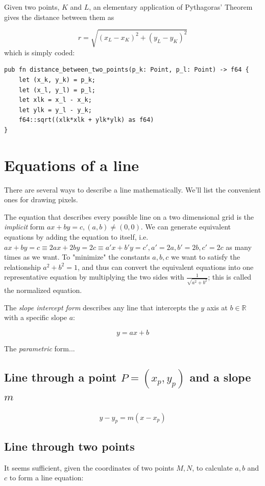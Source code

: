 \documentclass[12pt,a4,oneside,usenames,dvipsnames]{book}
\newcommand\pixels{{\pixelfont{}pixels}}
\begin{document}
Given two points, $K$ and $L$, an elementary application of Pythagoras' Theorem gives the distance between them as

\begin{equation}
  r = \sqrt{(x_{L} - x_{K})^{2} +(y_{L} - y_{K})^{2}}
\end{equation}
which is simply coded:
\begin{verbatim}
pub fn distance_between_two_points(p_k: Point, p_l: Point) -> f64 {
    let (x_k, y_k) = p_k;
    let (x_l, y_l) = p_l;
    let xlk = x_l - x_k;
    let ylk = y_l - y_k;
    f64::sqrt((xlk*xlk + ylk*ylk) as f64)
}
\end{verbatim}
\chapter{Equations of a line}\label{ch:equations-lines}
There are several ways to describe a line mathematically. We'll list the convenient ones for drawing \pixels{}.

The equation that describes every possible line on a two dimensional grid is the \emph{implicit} form $ax+by=c, (a,b) \neq{} (0,0)$. We can generate equivalent equations by adding the equation to itself, i.e. $ax+by=c \equiv 2ax+2by=2c \equiv a'x+b'y=c', a'=2a, b'=2b, c'=2c$ as many times as we want. To "minimize" the constants $a,b,c$ we want to satisfy the relationship $a^{2}+b^{2}=1$, and thus can convert the equivalent equations into one representative equation by multiplying the two sides with $\frac{1}{\sqrt{a^2+b^2}}$; this is called the normalized equation. %

The \emph{slope intercept form} describes any line that intercepts the $y$ axis at $b \in{} \mathbb{R}$ with a specific slope $a$:

$$y=ax+b$$

The \emph{parametric} form... %


\section{Line through a point $P=(x_p,y_p)$ and a slope $m$}

$$y-y_p=m(x-x_p)$$

\section{Line through two points}
  \begin{figure}
  {\centering%

  }
  \end{figure}
It seems sufficient, given the coordinates of two points $M, N$, to calculate $a, b$ and $c$ to form a line equation:
\end{document}
